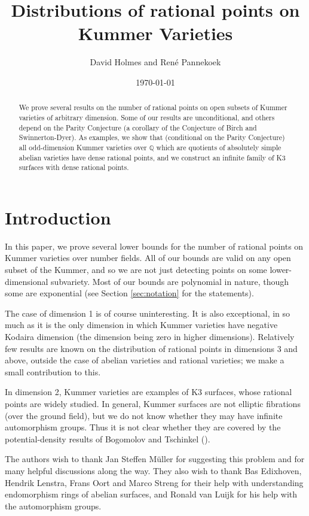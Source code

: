 \documentclass[a4paper,12pt]{amsart}
\title{Distributions of rational points on Kummer Varieties}
\author{David Holmes and Ren\'e Pannekoek}
\date{\today}
\begin{document}
\maketitle
\begin{abstract}
We prove several results on the number of rational points on open subsets of Kummer varieties of arbitrary dimension. Some of our results are unconditional, and others depend on the Parity Conjecture (a corollary of the Conjecture of Birch and Swinnerton-Dyer). As examples, we show that (conditional on the Parity Conjecture) all odd-dimension Kummer varieties over ${{\mathbb Q}}$ which are quotients of absolutely simple abelian varieties have dense rational points, and we construct an infinite family of K3 surfaces with dense rational points. 
\end{abstract}
\tableofcontents

\section{Introduction}

In this paper, we prove several lower bounds for the number of rational points on Kummer varieties over number fields. All of our bounds are valid on any open subset of the Kummer, and so we are not just detecting points on some lower-dimensional subvariety. Most of our bounds are polynomial in nature, though some are exponential (see Section \ref{sec:notation} for the statements). 

The case of dimension 1 is of course uninteresting. It is also exceptional, in so much as it is the only dimension in which Kummer varieties have negative Kodaira dimension (the dimension being zero in higher dimensions). Relatively few results are known on the distribution of rational points in dimensions 3 and above, outside the case of abelian varieties and rational varieties; we make a small contribution to this. 

In dimension 2, Kummer varieties are examples of K3 surfaces, whose rational points are widely studied. In general, Kummer surfaces are not elliptic fibrations (over the ground field), but we do not know whether they may have infinite automorphism groups. Thus it is not clear whether they are covered by the potential-density results  of Bogomolov and Tschinkel (\cite{bogomolov1999density}). 

The authors wish to thank Jan Steffen M\"uller for suggesting this problem and for many helpful discussions along the way. They also wish to thank Bas Edixhoven, Hendrik Lenstra, Frans Oort and Marco Streng for their help with understanding endomorphism rings of abelian surfaces, and Ronald van Luijk for his help with the automorphism groups. 
\end{document}
